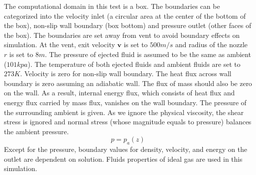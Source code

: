 \documentclass[review]{elsarticle}
\begin{document}
The computational domain in this test is a box. The boundaries can be categorized into the velocity inlet (a circular area at the center of the bottom of the box), non-slip wall boundary (box bottom) and pressure outlet (other faces of the box). The boundaries are set away from vent to avoid boundary effects on simulation.
At the vent, exit velocity $\textbf{v}$ is set to $500 m / s$ and radius of the nozzle $r$ is set to $8m $. The pressure of ejected fluid is assumed to be the same as ambient ($101 kpa$). The temperature of both ejected fluids and ambient fluids are set to $273 K$. 
Velocity is zero for non-slip wall boundary. The heat flux across wall boundary is zero assuming an adiabatic wall. The flux of mass should also be zero on the wall. As a result, internal energy flux, which consists of heat flux and energy flux carried by mass flux, vanishes on the wall boundary. 
The pressure of the surrounding ambient is given. As we ignore the physical viscosity, the shear stress is ignored and normal stress (whose magnitude equals to pressure) balances the ambient pressure.
\begin{equation}
p = p_a\left(z\right)  \label{eq:pressure_bc_p} 
\end{equation} 
Except for the pressure, boundary values for density, velocity, and energy on the outlet are dependent on solution. Fluids properties of ideal gas are used in this simulation.
\end{document}
